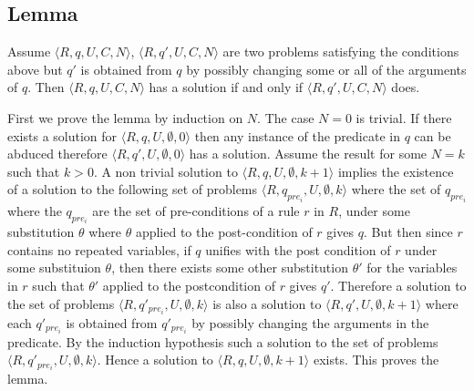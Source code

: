\documentclass[sigconf]{acmart}
\begin{document}
\subsection{Lemma}
Assume $\langle R,q,U,C,N\rangle$, $\langle R,q',U,C,N\rangle$ are two problems satisfying the conditions above but $q'$ is obtained from $q$ by possibly changing some or all of the arguments of $q$. Then $\langle R,q,U,C,N\rangle$ has a solution if and only if $\langle R,q',U,C,N\rangle$ does.

First we prove the lemma by induction on $N$.
The case $N = 0$ is trivial. If there exists a solution for $\langle R,q,U,\emptyset,0\rangle$ then any instance of the predicate in $q$ can be abduced therefore $\langle R,q',U,\emptyset,0\rangle$ has a solution. Assume the result for some $N = k$ such that $k>0$. A non trivial solution to $\langle R,q,U,\emptyset,k+1\rangle$ implies the existence of a solution to the following set of problems $\langle R,q_{pre_{i}},U,\emptyset,k\rangle$ where the set of $q_{pre_{i}}$ where the $q_{pre_{i}}$ are the set of pre-conditions of a rule $r$ in $R$, under some substitution $\theta$ where $\theta$ applied to the post-condition of $r$ gives $q$. But then since $r$ contains no repeated variables, if $q$ unifies with the post condition of $r$ under some substituion $\theta$, then there exists some other substitution $\theta'$ for the variables in $r$ such that $\theta'$ applied to the postcondition of $r$ gives $q'$. Therefore a solution to the set of problems $\langle R,q'_{pre_{i}},U,\emptyset,k\rangle$ is also a solution to $\langle R,q',U,\emptyset,k+1\rangle$ where each $q'_{pre_{i}}$ is obtained from $q'_{pre_{i}}$ by possibly changing the arguments in the predicate. By the induction hypothesis such a solution to the set of problems $\langle R,q'_{pre_{i}},U,\emptyset,k\rangle$. Hence a solution to  $\langle R,q,U,\emptyset,k+1\rangle$ exists. This proves the lemma.
\end{document}
